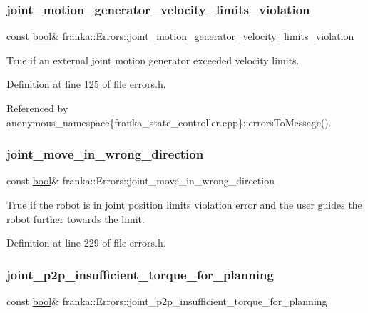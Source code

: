\subsubsection{\texorpdfstring{joint\+\_\+motion\+\_\+generator\+\_\+velocity\+\_\+limits\+\_\+violation}{joint\_motion\_generator\_velocity\_limits\_violation}}
{\footnotesize\ttfamily const \hyperlink{classbool}{bool}\& franka\+::\+Errors\+::joint\+\_\+motion\+\_\+generator\+\_\+velocity\+\_\+limits\+\_\+violation}

True if an external joint motion generator exceeded velocity limits. 

Definition at line 125 of file errors.\+h.



Referenced by anonymous\+\_\+namespace\{franka\+\_\+state\+\_\+controller.\+cpp\}\+::errors\+To\+Message().

\mbox{\label{structfranka_1_1Errors_a7d3a6480cbe572fd46e579b43732edc9}} 
\subsubsection{\texorpdfstring{joint\+\_\+move\+\_\+in\+\_\+wrong\+\_\+direction}{joint\_move\_in\_wrong\_direction}}
{\footnotesize\ttfamily const \hyperlink{classbool}{bool}\& franka\+::\+Errors\+::joint\+\_\+move\+\_\+in\+\_\+wrong\+\_\+direction}

True if the robot is in joint position limits violation error and the user guides the robot further towards the limit. 

Definition at line 229 of file errors.\+h.

\mbox{\label{structfranka_1_1Errors_a1c78be870253b510a4516acf14c2d3e3}} 
\subsubsection{\texorpdfstring{joint\+\_\+p2p\+\_\+insufficient\+\_\+torque\+\_\+for\+\_\+planning}{joint\_p2p\_insufficient\_torque\_for\_planning}}
{\footnotesize\ttfamily const \hyperlink{classbool}{bool}\& franka\+::\+Errors\+::joint\+\_\+p2p\+\_\+insufficient\+\_\+torque\+\_\+for\+\_\+planning}

